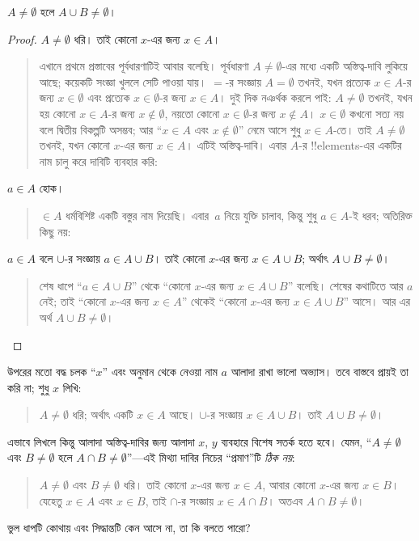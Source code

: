 \documentclass[../../../include/open-logic-section]{subfiles}
\begin{document}
\begin{prop}
$A \neq \emptyset$ হলে $A \cup B \neq \emptyset$।
\end{prop}

\begin{proof}
  $A \neq \emptyset$ ধরি। তাই কোনো $x$-এর জন্য
  $x \in A$।
  \begin{quote}
    এখানে প্রথমে প্রস্তাবের পূর্বধারণাটিই আবার বলেছি।
    পূর্বধারণা $A \neq \emptyset$-এর মধ্যে একটি
    অস্তিত্ব-দাবি লুকিয়ে আছে; কয়েকটি সংজ্ঞা খুললে
    সেটি পাওয়া যায়। $=$-র সংজ্ঞায় $A = \emptyset$
    তখনই, যখন প্রত্যেক $x \in A$-র জন্য
    $x \in \emptyset$ এবং প্রত্যেক $x \in
    \emptyset$-র জন্য $x \in A$। দুই দিক নঞর্থক
    করলে পাই: $A \neq \emptyset$ তখনই, যখন
    হয় কোনো $x \in A$-র জন্য $x \notin \emptyset$,
    নয়তো কোনো $x \in \emptyset$-র জন্য
    $x \notin A$। $x \in \emptyset$ কখনো সত্য নয় বলে
    দ্বিতীয় বিকল্পটি অসম্ভব; আর ``$x \in A$ এবং
    $x \notin \emptyset$'' নেমে আসে শুধু
    $x \in A$-তে। তাই
    $A \neq \emptyset$ তখনই, যখন কোনো $x$-এর
    জন্য $x \in A$। এটিই অস্তিত্ব-দাবি। এবার
    $A$-র !!{element}s-এর একটির নাম চালু করে
    দাবিটি ব্যবহার করি:
  \end{quote}
  $a \in A$ হোক।
  \begin{quote}
    $\in A$ ধর্মবিশিষ্ট একটি বস্তুর নাম দিয়েছি।
    এবার~$a$ নিয়ে যুক্তি চালাব, কিন্তু শুধু
    $a \in A$-ই ধরব; অতিরিক্ত কিছু নয়:
  \end{quote}
  $a \in A$ বলে $\cup$-র সংজ্ঞায়
  $a \in A \cup B$। তাই কোনো $x$-এর জন্য
  $x \in A \cup B$; অর্থাৎ $A \cup B \neq \emptyset$।
  \begin{quote}
    শেষ ধাপে ``$a \in A \cup B$'' থেকে
    ``কোনো $x$-এর জন্য $x \in A \cup B$'' বলেছি।
    শেষের কথাটিতে আর $a$ নেই; তাই ``কোনো $x$-এর
    জন্য $x \in A$'' থেকেই ``কোনো $x$-এর জন্য
    $x \in A \cup B$'' আসে। আর এর অর্থ
    $A \cup B \neq \emptyset$।
  \end{quote}
\end{proof}

উপরের মতো বদ্ধ চলক ``$x$'' এবং অনুমান থেকে
নেওয়া নাম $a$ আলাদা রাখা ভালো অভ্যাস। তবে
বাস্তবে প্রায়ই তা করি না; শুধু $x$ লিখি:
\begin{quote}
$A \neq \emptyset$ ধরি; অর্থাৎ একটি $x \in A$
আছে। $\cup$-র সংজ্ঞায় $x \in A \cup B$।
তাই $A \cup B \neq \emptyset$।
\end{quote}
এভাবে লিখলে কিন্তু আলাদা অস্তিত্ব-দাবির জন্য আলাদা
$x$, $y$ ব্যবহারে বিশেষ সতর্ক হতে হবে। যেমন,
``$A \neq \emptyset$ এবং $B \neq \emptyset$ হলে
$A \cap B \neq \emptyset$''—এই মিথ্যা দাবির
নিচের ``প্রমাণ''টি \emph{ঠিক নয়}:
\begin{quote}
$A \neq \emptyset$ এবং $B \neq \emptyset$ ধরি।
তাই কোনো $x$-এর জন্য $x \in A$, আবার কোনো
$x$-এর জন্য $x \in B$। যেহেতু $x \in A$
এবং $x \in B$, তাই $\cap$-র সংজ্ঞায়
$x \in A \cap B$। অতএব $A \cap B \neq
\emptyset$।
\end{quote}
ভুল ধাপটি কোথায় এবং সিদ্ধান্তটি কেন আসে না,
তা কি বলতে পারো?
\end{document}

